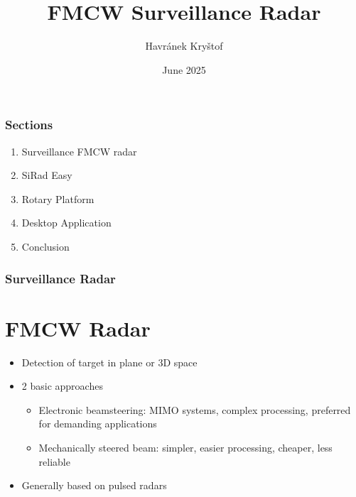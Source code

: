 \documentclass[aspectratio=169]{beamer}
\title{FMCW Surveillance Radar}
\author{Havránek Kryštof}
\date{June 2025}
\institute{České vysoké učení technické v Praze}
\begin{document}
\begin{frame}[plain]
  \maketitle
\end{frame}

\clearpage
\setcounter{framenumber}{0}

\begin{frame}[fragile]
  \frametitle{Sections}

  \begin{enumerate}
    \item Surveillance FMCW radar
    \item SiRad Easy
    \item Rotary Platform
    \item Desktop Application
    \item Conclusion
  \end{enumerate}
\end{frame}


\begin{frame}[fragile]
  \frametitle{Surveillance Radar}
  \section{FMCW Radar}

  \begin{itemize}
    \item Detection of target in plane or 3D space
    \item 2 basic approaches
      \begin{itemize}
        \item Electronic beamsteering: MIMO systems, complex processing, preferred for demanding applications
				\item Mechanically steered beam: simpler, easier processing, cheaper, less reliable
      \end{itemize}
    \item Generally based on pulsed radars
  \end{itemize}
\end{frame}
\end{document}
